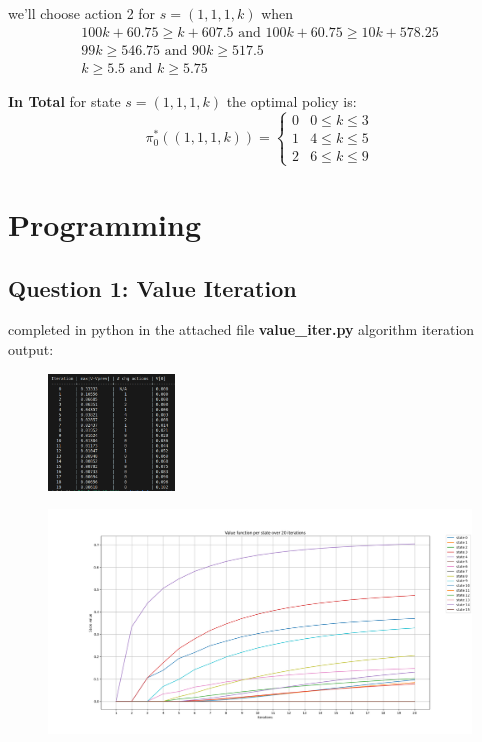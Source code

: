 \documentclass{assignmeownt}
\begin{document}
\begin{enumerate}
we'll choose action 2 for $s=(1, 1, 1, k)$ when
\newline
\begin{equation}
    \begin{array}{cc}
        100k + 60.75 \geq k + 607.5 \text{ and } 100k + 60.75 \geq 10k + 578.25 \\
        99k \geq 546.75 \text{ and } 90k \geq 517.5 \\
        k \geq 5.5 \text{ and } k \geq 5.75
    \end{array}
\end{equation}

\textbf{In Total} for state $s=(1, 1, 1, k)$ the optimal policy is:
\begin{equation}
\pi^*_0((1, 1, 1, k)) = 
\begin{cases}
0 & 0 \leq k \leq 3 \\
1 & 4 \leq k \leq 5 \\
2 & 6 \leq k \leq 9
\end{cases}
\end{equation}
\qedsymbol{}


\end{enumerate} %

\section{Programming}

\subsection{Question 1: Value Iteration}
completed in python in the attached file \textbf{value\_iter.py}
\newline
algorithm iteration output:
\begin{figure}[H]
    \centering
    \includegraphics[width=0.3\textwidth]{q2_1_iter_table_print.png}
\end{figure}

\begin{figure}[H]
    \centering
    \includegraphics[width=1.0\textwidth]{q2_1_state_value_per_iter_plot.png}
\end{figure}
\end{document}
